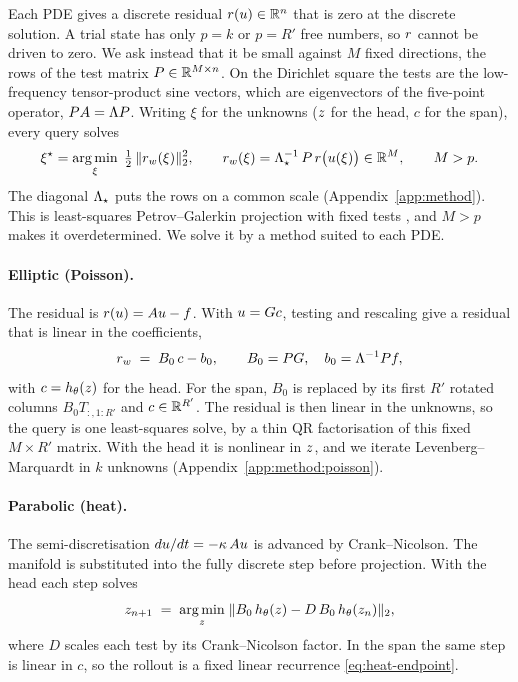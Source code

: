 \documentclass{article}
\begin{document}
Each PDE gives a discrete residual $r(u)\in\mathbb{R}^{n}$ that is zero at
the discrete solution. A trial state has only $p=k$ or $p=R'$ free
numbers, so $r$ cannot be driven to zero. We ask instead that it be
small against $M$ fixed directions, the rows of the test matrix
$P\in\mathbb{R}^{M\times n}$. On the Dirichlet square the tests are the
low-frequency tensor-product sine vectors, which are eigenvectors of the
five-point operator, $PA=\Lambda P$. Writing $\xi$ for the
unknowns ($z$ for the head, $c$ for the span), every query solves
\begin{equation}
  \xi^{\star}
  =
  \operatorname*{arg\,min}_{\xi}\;
  \tfrac12\,\lVert r_{w}(\xi) \rVert_2^2,
  \qquad
  r_{w}(\xi) = \Lambda_\star^{-1}\,P\,r\big(u(\xi)\big)
  \in\mathbb{R}^{M},
  \qquad M>p .
  \label{eq:objective}
\end{equation}
The diagonal $\Lambda_\star$ puts the rows on a common scale
(Appendix~\ref{app:method}). This is least-squares Petrov--Galerkin
projection with fixed tests \citep{Carlberg2011LSPG,LeeCarlberg2020}, and
$M>p$ makes it overdetermined. We solve it by a method suited to each
PDE.

\paragraph{Elliptic (Poisson).}
The residual is $r(u)=A u-f$. With $u=G c$, testing and
rescaling give a residual that is linear in the coefficients,
\begin{equation}
  r_{w}
  \;=\;
  B_0\,c - b_0,
  \qquad
  B_0=PG,\quad b_0=\Lambda^{-1}P f ,
  \label{eq:poisson-residual}
\end{equation}
with $c=h_\theta(z)$ for the head. For the span, $B_0$ is replaced by
its first $R'$ rotated columns $B_0T_{:,1:R'}$ and $c\in\mathbb{R}^{R'}$. The
residual is then linear in the unknowns, so the query is one
least-squares solve, by a thin QR factorisation of this fixed
$M\times R'$ matrix. With the head it is nonlinear in $z$, and we
iterate Levenberg--Marquardt in $k$ unknowns
(Appendix~\ref{app:method:poisson}).

\paragraph{Parabolic (heat).}
The semi-discretisation $du/dt=-\kappa\,A u$ is advanced by
Crank--Nicolson. The manifold is substituted into the fully discrete step
before projection. With the head each step solves
\begin{equation}
  z_{n+1}
  \;=\;
  \operatorname*{arg\,min}_{z}\;
  \lVert B_0\,h_\theta(z) - D\,B_0\,h_\theta(z_n) \rVert_2,
  \label{eq:heat-step}
\end{equation}
where $D$ scales each test by its Crank--Nicolson factor. In the span the
same step is linear in $c$, so the rollout is a fixed linear recurrence
\eqref{eq:heat-endpoint}.
\end{document}
